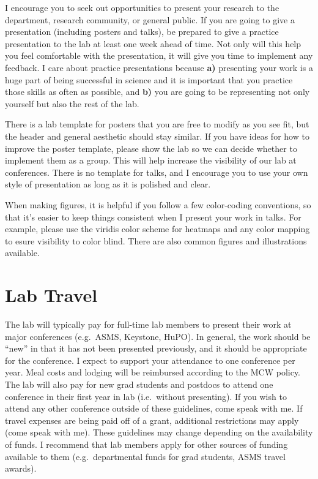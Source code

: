 \documentclass[
]{book}
\begin{document}
I encourage you to seek out opportunities to present your research to the department, research community, or general public. If you are going to give a presentation (including posters and talks), be prepared to give a practice presentation to the lab at least one week ahead of time. Not only will this help you feel comfortable with the presentation, it will give you time to implement any feedback. I care about practice presentations because \textbf{a)} presenting your work is a huge part of being successful in science and it is important that you practice those skills as often as possible, and \textbf{b)} you are going to be representing not only yourself but also the rest of the lab.

There is a lab template for posters that you are free to modify as you see fit, but the header and general aesthetic should stay similar. If you have ideas for how to improve the poster template, please show the lab so we can decide whether to implement them as a group. This will help increase the visibility of our lab at conferences. There is no template for talks, and I encourage you to use your own style of presentation as long as it is polished and clear.

When making figures, it is helpful if you follow a few color-coding conventions, so that it's easier to keep things consistent when I present your work in talks. For example, please use the viridis color scheme for heatmaps and any color mapping to esure visibility to color blind. There are also common figures and illustrations available.

\hypertarget{lab-travel}{%
\section{Lab Travel}\label{lab-travel}}

The lab will typically pay for full-time lab members to present their work at major conferences (e.g.~ASMS, Keystone, HuPO). In general, the work should be ``new'' in that it has not been presented previously, and it should be appropriate for the conference. I expect to support your attendance to one conference per year. Meal costs and lodging will be reimbursed according to the MCW policy. The lab will also pay for new grad students and postdocs to attend one conference in their first year in lab (i.e.~without presenting). If you wish to attend any other conference outside of these guidelines, come speak with me. If travel expenses are being paid off of a grant, additional restrictions may apply (come speak with me). These guidelines may change depending on the availability of funds. I recommend that lab members apply for other sources of funding available to them (e.g.~departmental funds for grad students, ASMS travel awards).
\end{document}
